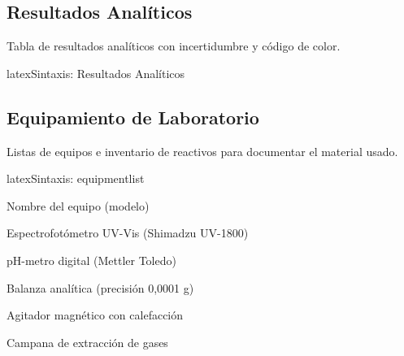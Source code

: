 \subsection{Resultados Analíticos}
\label{subsec:analiticos}

Tabla de resultados analíticos con incertidumbre y código de color.

\begin{codigosimple}{latex}{Sintaxis: Resultados Analíticos}
\begin{analyticalresults}
\end{analyticalresults}
\end{codigosimple}

\begin{analyticalresults}
\end{analyticalresults}

\subsection{Equipamiento de Laboratorio}
\label{subsec:equipamiento}

Listas de equipos e inventario de reactivos para documentar el material usado.


\begin{codigosimple}{latex}{Sintaxis: equipmentlist}
\begin{equipmentlist}
  \item Nombre del equipo (modelo)
\end{equipmentlist}
\end{codigosimple}

\begin{equipmentlist}
  \item Espectrofotómetro UV-Vis (Shimadzu UV-1800)
  \item pH-metro digital (Mettler Toledo)
  \item Balanza analítica (precisión 0,0001 g)
  \item Agitador magnético con calefacción
  \item Campana de extracción de gases
\end{equipmentlist}


